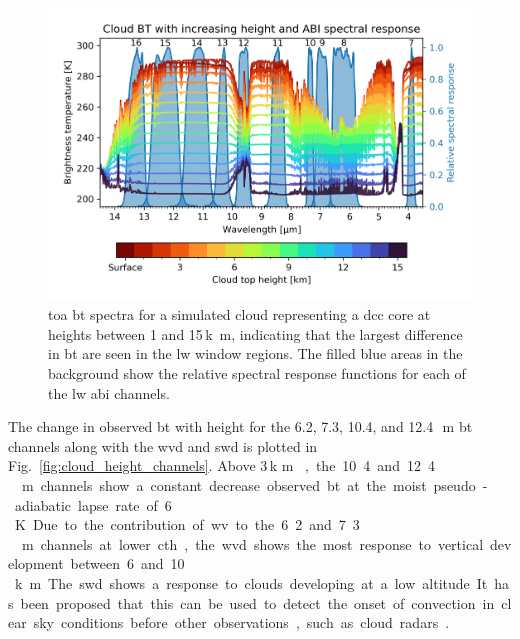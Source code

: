 \begin{figure}[tp]
    \includegraphics[width=\textwidth]{figures/chapter1_05.png}
    \caption[
    \acrshort{toa} \acrshort{bt} spectra for a simulated cloud representing a \acrshort{dcc} core at heights between 1 and 15\,\unit{k m}
    ]{
    \acrshort{toa} \acrshort{bt} spectra for a simulated cloud representing a \acrshort{dcc} core at heights between 1 and 15\,\unit{k m}, indicating that the largest difference in \acrshort{bt} are seen in the \acrshort{lw} window regions. The filled blue areas in the background show the relative spectral response functions for each of the \acrshort{lw} \acrshort{abi} channels.
    }
    \label{fig:cloud_height_spectra}
\end{figure}


The change in observed \acrshort{bt} with height for the 6.2, 7.3, 10.4, and 12.4\,\unit{\mu m} \acrshort{bt} channels along with the \acrshort{wvd} and \acrshort{swd} is plotted in Fig.~\ref{fig:cloud_height_channels}. 
Above 3\,\unit{k m }, the 10.4 and 12.4\,\unit{\mu m} channels show a constant decrease observed \acrshort{bt} at the moist pseudo-adiabatic lapse rate of 6\,\unit{K}.
Due to the contribution of \acrshort{wv} to the 6.2 and 7.3\,\unit{\mu m} channels at lower \acrfull{cth}, the \acrshort{wvd} shows the most response to vertical development between 6 and 10\,\unit{k m}.
The \acrshort{swd} shows a response to clouds developing at a low altitude.
It has been proposed that this can be used to detect the onset of convection in clear sky conditions before other observations, such as cloud radars \citep{lindsey_use_2014, lindsey_using_2018}.


